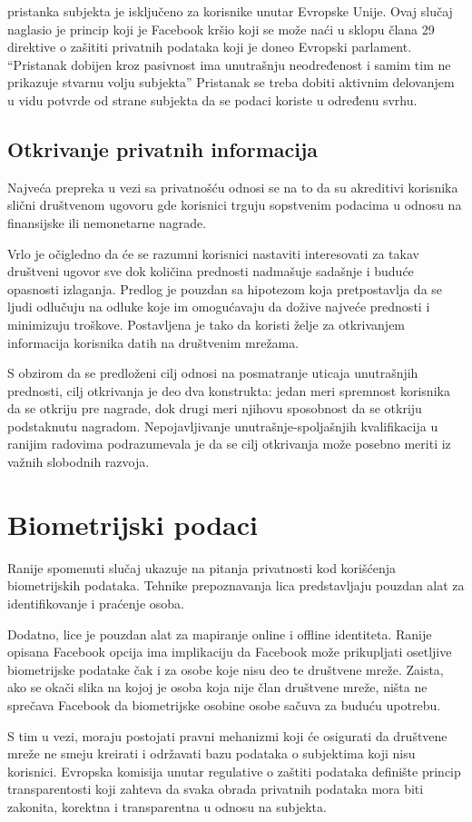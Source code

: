 \documentclass[a4paper]{article}
\begin{document}
pristanka subjekta je isključeno za korisnike unutar Evropske Unije. Ovaj slučaj naglasio je princip koji je Facebook kršio koji se može naći u sklopu člana 29 direktive o zašititi privatnih podataka koji je doneo Evropski parlament. “Pristanak dobijen kroz pasivnost ima unutrašnju neodređenost i samim tim ne prikazuje stvarnu volju subjekta”\cite{EU} Pristanak se treba dobiti aktivnim delovanjem u vidu potvrde od strane subjekta da se podaci koriste u određenu svrhu. 

\subsection{Otkrivanje privatnih informacija}
Najveća prepreka u vezi sa privatnošću odnosi se na to da su akreditivi korisnika slični društvenom ugovoru gde korisnici trguju sopstvenim podacima u odnosu na finansijske ili nemonetarne nagrade.\par  Vrlo je očigledno da će se razumni korisnici nastaviti interesovati za takav društveni ugovor sve dok količina prednosti nadmašuje sadašnje i buduće opasnosti izlaganja. Predlog je pouzdan sa hipotezom  koja pretpostavlja da se ljudi odlučuju   na odluke  koje im omogućavaju   da dožive najveće prednosti i minimizuju troškove. Postavljena je tako da koristi želje za otkrivanjem informacija korisnika datih na  društvenim mrežama.\par   S obzirom da  se  predloženi cilj odnosi na posmatranje uticaja unutrašnjih  prednosti, cilj otkrivanja je deo dva konstrukta: jedan   meri spremnost korisnika da se otkriju pre nagrade, dok drugi meri njihovu sposobnost da se otkriju podstaknutu nagradom. Nepojavljivanje unutrašnje-spoljašnjih kvalifikacija u ranijim radovima  podrazumevala je da se cilj otkrivanja može posebno meriti iz važnih slobodnih razvoja. 

\newpage

\section{Biometrijski podaci}
Ranije spomenuti slučaj ukazuje na pitanja privatnosti kod korišćenja biometrijskih podataka. Tehnike prepoznavanja lica predstavljaju pouzdan alat za identifikovanje i praćenje osoba. 
\par Dodatno, lice je pouzdan alat za mapiranje online i offline identiteta. Ranije opisana Facebook opcija ima implikaciju da Facebook može prikupljati osetljive biometrijske podatake čak i za osobe koje nisu deo te društvene mreže. Zaista, ako se okači slika na kojoj je osoba koja nije član društvene mreže, ništa ne sprečava Facebook da biometrijske osobine osobe sačuva za buduću upotrebu.\par  S tim u vezi, moraju postojati pravni mehanizmi koji će osigurati da društvene mreže ne smeju kreirati i održavati bazu podataka o subjektima koji nisu korisnici. Evropska komisija unutar regulative o zaštiti
podataka definište princip transparentosti koji zahteva da svaka obrada privatnih podataka mora biti zakonita, korektna i transparentna u odnosu na subjekta. 
\end{document}
